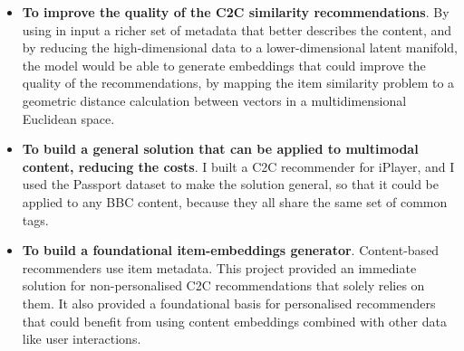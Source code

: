 \begin{itemize}
  \item \textbf{To improve the quality of the C2C similarity recommendations}. By using in input a richer set of metadata that
  better describes the content, and by reducing the high-dimensional data to a lower-dimensional latent manifold,
  the model would be able to generate embeddings that could improve the quality of the recommendations, by mapping the
  item similarity problem to a geometric distance calculation between vectors in a multidimensional Euclidean space.
  \item \textbf{To build a general solution that can be applied to multimodal content, reducing the costs}. I built a C2C
  recommender for iPlayer, and I used the Passport dataset to make the solution general, so that it could be applied to any BBC content, because they all share the same set of common tags.
  \item \textbf{To build a foundational item-embeddings generator}. Content-based recommenders
  use item metadata. This project provided an immediate solution for non-personalised C2C recommendations that solely relies on them.
  It also provided a foundational basis for personalised recommenders that could benefit from using content embeddings combined with other data like user interactions.
\end{itemize}
